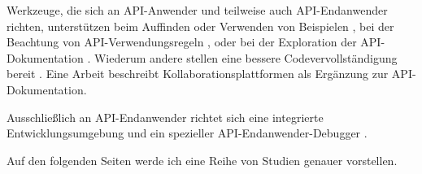Werkzeuge, die sich an API-Anwender und teilweise auch API-Endanwender richten, unterstützen beim Auffinden oder Verwenden von Beispielen \citep{Neal:1989ef,Ye:2002fd,Dagenais:2008kj,Wightman:2012gc,Stylos:2006gu,Oney:2012ge,Doerner:2014cm,Holmes:2005cm,Bruch:2006bv}, bei der Beachtung von API-Verwendungsregeln \citep{dekel2011increasing,Feilkas:dg,Bruch:2006bv}, oder bei der Exploration der API-Dokumentation \citep{Stylos:2009gc,Eisenberg:2010bm,Eisenberg:2010ds,Bruch:2006bv,DualaEkoko:2011th}. Wiederum andere stellen eine bessere Codevervollständigung bereit \citep{Hou:2010fd,Omar:2012tw,Zhang:2012wl}. Eine Arbeit \citep{DaqingHou:2005ba} beschreibt Kollaborationsplattformen als Ergänzung zur API-Dokumentation.

Ausschließlich an API-Endanwender richtet sich eine integrierte Entwicklungsumgebung \citep{Gross:2011ie} und ein spezieller API-Endanwender-Debugger \citep{Ko:2004fc}.


\vspace{1cm}
Auf den folgenden Seiten werde ich eine Reihe von Studien genauer vorstellen.